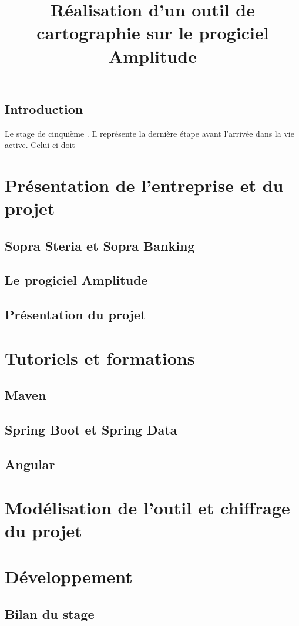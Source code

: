 \documentclass{polytech/polytech}
\title{Réalisation d'un outil de cartographie sur le progiciel Amplitude}
\begin{document}
\chapter*{Introduction}

Le stage de cinquième . Il représente la dernière étape avant l'arrivée dans la vie active. Celui-ci doit 

\part{Présentation de l'entreprise et du projet}


\chapter{Sopra Steria et Sopra Banking}


\chapter{Le progiciel Amplitude}


\chapter{Présentation du projet}


\part{Tutoriels et formations}


\chapter{Maven}

\chapter{Spring Boot et Spring Data}

\chapter{Angular}


\part{Modélisation de l'outil et chiffrage du projet}


\part{Développement}


\chapter{Bilan du stage}


\appendix
\end{document}

